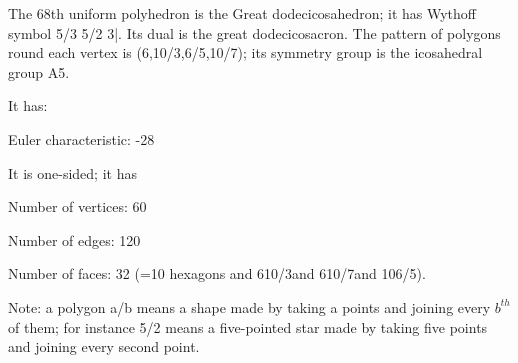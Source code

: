The 68th uniform polyhedron is the Great dodecicosahedron; it has Wythoff symbol 5/3 5/2 3|. Its dual is the great dodecicosacron. The pattern of polygons round each vertex is (6,10/3,6/5,10/7); its symmetry group is the icosahedral group A5.\par
It has:\par
Euler characteristic: -28\par
It is one-sided; it has\par
Number of vertices: 60\par
Number of edges:  120\par
Number of faces: 32 (=10 hexagons and 6{10/3}and 6{10/7}and 10{6/5}).\par
Note: a polygon a/b means a shape made by taking a points and joining every $b^{th}$  of them; for instance 5/2 means a five-pointed star made by taking five points and joining every second point.